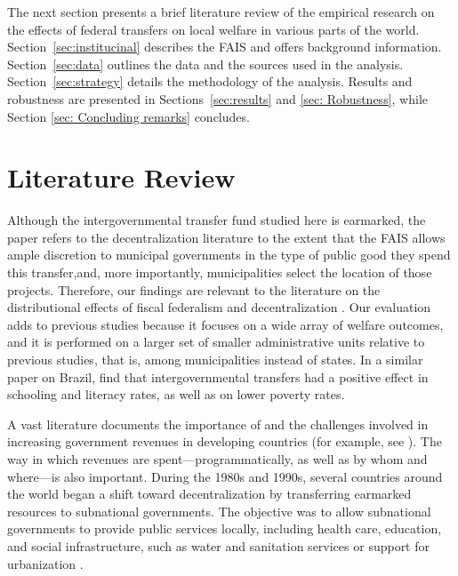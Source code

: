 \documentclass[dv_diss_main.tex]{subfiles}
\begin{document}
The next section presents a brief literature review of the empirical research on the effects of federal transfers on local welfare in various parts of the world. Section~\ref{sec:institucinal} describes the FAIS and offers background information. Section~\ref{sec:data} outlines the data and the sources used in the analysis. Section~\ref{sec:strategy} details the methodology of the analysis. Results and robustness are presented in Sections~\ref{sec:results} and \ref{sec: Robustness}, while Section \ref{sec: Concluding remarks} concludes.



\section{Literature Review} \label{sec:literarure}

Although the intergovernmental transfer fund studied here is earmarked, the paper refers to the decentralization literature to the extent that the FAIS allows ample discretion to municipal governments in the type of public good they spend this transfer,and, more importantly, municipalities select the location of those projects. Therefore, our findings are relevant to the literature on the distributional effects of fiscal federalism and decentralization \citep{oates1972fiscal,musgrave1983should,wallis1988decentralization,ostrom1993relational,litvack1998rethinking,habibi2003decentralization,jimenez2011impact,martinez2015impact}. Our evaluation adds to previous studies because it focuses on a wide array of welfare outcomes, and it is performed on a larger set of smaller administrative units relative to previous studies, that is, among municipalities instead of states. In a similar paper on Brazil, \cite{litschig2013impact} find that intergovernmental transfers had a positive effect in schooling and literacy rates, as well as on lower poverty rates.

A vast literature documents the importance of and the challenges involved in increasing government revenues in developing countries (for example, see \cite{besley2014developing}). The way in which revenues are spent—programmatically, as well as by whom and where—is also important. During the 1980s and 1990s, several countries around the world began a shift toward decentralization by transferring earmarked resources to subnational governments. The objective was to allow subnational governments to provide public services locally, including health care, education, and social infrastructure, such as water and sanitation services or support for urbanization \citep{conning1999community,jimenez1999community,bardhan2005decentralizing}.
\end{document}
